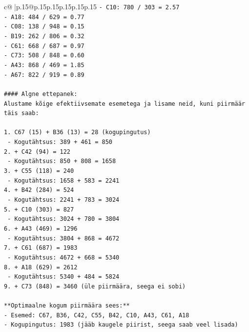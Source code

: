 \documentclass{article}
\begin{document}
{\begin{supertabular}{c@{$\;$}|p{.15\linewidth}@{}p{.15\linewidth}p{.15\linewidth}p{.15\linewidth}p{.15\linewidth}p{.15\linewidth}}
{{{\texttt{{-} C10: 780 / 303 = 2.57} \\
\texttt{{-} A18: 484 / 629 = 0.77} \\
\texttt{{-} C08: 138 / 948 = 0.15} \\
\texttt{{-} B19: 262 / 806 = 0.32} \\
\texttt{{-} C61: 668 / 687 = 0.97} \\
\texttt{{-} C73: 508 / 848 = 0.60} \\
\texttt{{-} A43: 868 / 469 = 1.85} \\
\texttt{{-} A67: 822 / 919 = 0.89} \\
\\ 
\texttt{\#\#\#\# Algne ettepanek:} \\
\texttt{Alustame kõige efektiivsemate esemetega ja lisame neid, kuni piirmäär täis saab:} \\
\\ 
\texttt{1. C67 (15) + B36 (13) = 28 (kogupingutus)} \\
\texttt{   {-} Kogutähtsus: 389 + 461 = 850} \\
\texttt{2. + C42 (94) = 122} \\
\texttt{   {-} Kogutähtsus: 850 + 808 = 1658} \\
\texttt{3. + C55 (118) = 240} \\
\texttt{   {-} Kogutähtsus: 1658 + 583 = 2241} \\
\texttt{4. + B42 (284) = 524} \\
\texttt{   {-} Kogutähtsus: 2241 + 783 = 3024} \\
\texttt{5. + C10 (303) = 827} \\
\texttt{   {-} Kogutähtsus: 3024 + 780 = 3804} \\
\texttt{6. + A43 (469) = 1296} \\
\texttt{   {-} Kogutähtsus: 3804 + 868 = 4672} \\
\texttt{7. + C61 (687) = 1983} \\
\texttt{   {-} Kogutähtsus: 4672 + 668 = 5340} \\
\texttt{8. + A18 (629) = 2612} \\
\texttt{   {-} Kogutähtsus: 5340 + 484 = 5824} \\
\texttt{9. + C73 (848) = 3460 (üle piirmäära, seega ei sobi)} \\
\\ 
\texttt{**Optimaalne kogum piirmäära sees:**} \\
\texttt{{-} Esemed: C67, B36, C42, C55, B42, C10, A43, C61, A18} \\
\texttt{{-} Kogupingutus: 1983 (jääb kaugele piirist, seega saab veel lisada)} \\
}}}
\end{supertabular}}
\end{document}
